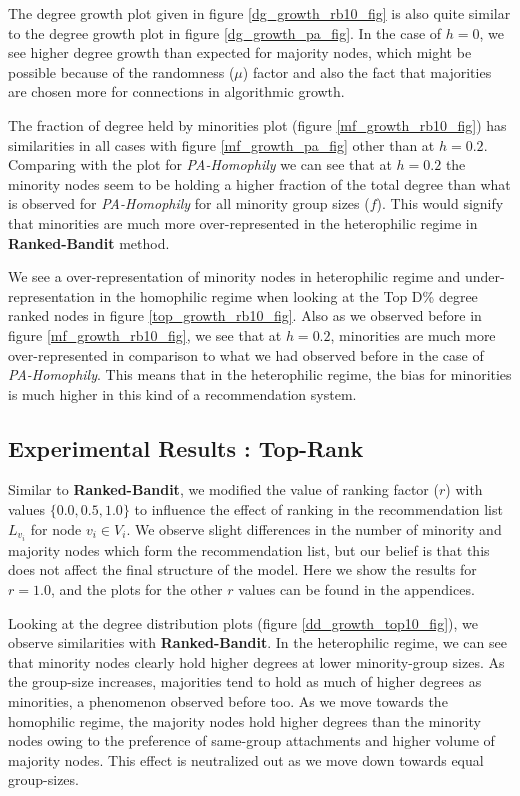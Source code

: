 The degree growth plot given in figure \ref{dg_growth_rb10_fig} is also quite similar to the degree growth plot in figure \ref{dg_growth_pa_fig}. In the case of $h=0$, we see higher degree growth than expected for majority nodes, which might be possible because of the randomness ($\mu$) factor and also the fact that majorities are chosen more for connections in algorithmic growth.

The fraction of degree held by minorities plot (figure \ref{mf_growth_rb10_fig}) has similarities in all cases with figure \ref{mf_growth_pa_fig} other than at $h=0.2$. Comparing with the plot for \textit{PA-Homophily} we can see that at $h=0.2$ the minority nodes seem to be holding a higher fraction of the total degree than what is observed for \textit{PA-Homophily} for all minority group sizes ($f$). This would signify that minorities are much more over-represented in the heterophilic regime in \textbf{Ranked-Bandit} method.

We see a over-representation of minority nodes in heterophilic regime and under-representation in the homophilic regime when looking at the Top D\% degree ranked nodes in figure \ref{top_growth_rb10_fig}. Also as we observed before in figure \ref{mf_growth_rb10_fig}, we see that at $h=0.2$, minorities are much more over-represented in comparison to what we had observed before in the case of \textit{PA-Homophily}. This means that in the heterophilic regime, the bias for minorities is much higher in this kind of a recommendation system. 

\subsection{Experimental Results : Top-Rank}

Similar to \textbf{Ranked-Bandit}, we modified the value of ranking factor ($r$) with values $\{0.0, 0.5, 1.0\}$ to influence the effect of ranking in the recommendation list $L_{v_{i}}$ for node $v_{i} \in V_{i}$. We observe slight differences in the number of minority and majority nodes which form the recommendation list, but our belief is that this does not affect the final structure of the model. Here we show the results for $r=1.0$, and the plots for the other $r$ values can be found in the appendices.

Looking at the degree distribution plots (figure \ref{dd_growth_top10_fig}), we observe similarities with \textbf{Ranked-Bandit}. In the heterophilic regime, we can see that minority nodes clearly hold higher degrees at lower minority-group sizes. As the group-size increases, majorities tend to hold as much of higher degrees as minorities, a phenomenon observed before too. As we move towards the homophilic regime, the majority nodes hold higher degrees than the minority nodes owing to the preference of same-group attachments and higher volume of majority nodes. This effect is neutralized out as we move down towards equal group-sizes. 

